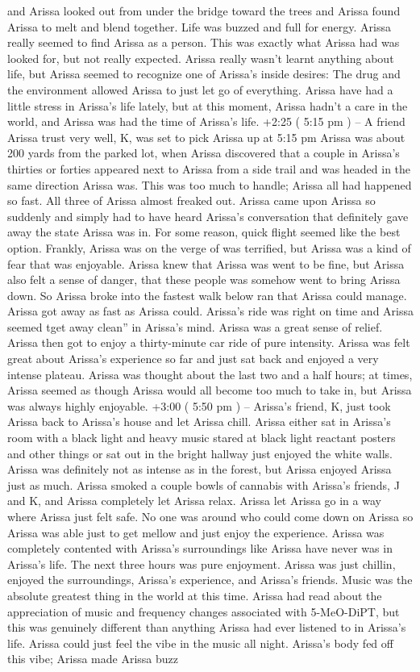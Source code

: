 \documentclass[12pt]{book}
\begin{document}
and Arissa looked out from under the bridge toward the trees and Arissa found Arissa to melt and blend together. Life was buzzed and full for energy. Arissa really seemed to find Arissa as a person. This was exactly what Arissa had was looked for, but not really expected. Arissa really wasn't learnt anything about life, but Arissa seemed to recognize one of Arissa's inside desires: The drug and the environment allowed Arissa to just let go of everything. Arissa have had a little stress in Arissa's life lately, but at this moment, Arissa hadn't a care in the world, and Arissa was had the time of Arissa's life. +2:25 ( 5:15 pm ) -- A friend Arissa trust very well, K, was set to pick Arissa up at 5:15 pm Arissa was about 200 yards from the parked lot, when Arissa discovered that a couple in Arissa's thirties or forties appeared next to Arissa from a side trail and was headed in the same direction Arissa was. This was too much to handle; Arissa all had happened so fast. All three of Arissa almost freaked out. Arissa came upon Arissa so suddenly and simply had to have heard Arissa's conversation that definitely gave away the state Arissa was in. For some reason, quick flight seemed like the best option. Frankly, Arissa was on the verge of was terrified, but Arissa was a kind of fear that was enjoyable. Arissa knew that Arissa was went to be fine, but Arissa also felt a sense of danger, that these people was somehow went to bring Arissa down. So Arissa broke into the fastest walk below ran that Arissa could manage. Arissa got away as fast as Arissa could. Arissa's ride was right on time and Arissa seemed tget away clean'' in Arissa's mind. Arissa was a great sense of relief. Arissa then got to enjoy a thirty-minute car ride of pure intensity. Arissa was felt great about Arissa's experience so far and just sat back and enjoyed a very intense plateau. Arissa was thought about the last two and a half hours; at times, Arissa seemed as though Arissa would all become too much to take in, but Arissa was always highly enjoyable. +3:00 ( 5:50 pm ) -- Arissa's friend, K, just took Arissa back to Arissa's house and let Arissa chill. Arissa either sat in Arissa's room with a black light and heavy music stared at black light reactant posters and other things or sat out in the bright hallway just enjoyed the white walls. Arissa was definitely not as intense as in the forest, but Arissa enjoyed Arissa just as much. Arissa smoked a couple bowls of cannabis with Arissa's friends, J and K, and Arissa completely let Arissa relax. Arissa let Arissa go in a way where Arissa just felt safe. No one was around who could come down on Arissa so Arissa was able just to get mellow and just enjoy the experience. Arissa was completely contented with Arissa's surroundings like Arissa have never was in Arissa's life. The next three hours was pure enjoyment. Arissa was just chillin, enjoyed the surroundings, Arissa's experience, and Arissa's friends. Music was the absolute greatest thing in the world at this time. Arissa had read about the appreciation of music and frequency changes associated with 5-MeO-DiPT, but this was genuinely different than anything Arissa had ever listened to in Arissa's life. Arissa could just feel the vibe in the music all night. Arissa's body fed off this vibe; Arissa made Arissa buzz 
\end{document}
